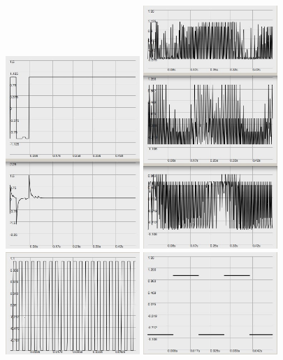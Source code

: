 \documentclass[letterpaper, 12pt]{article}
\begin{document}
\begin{figure}
	\centering
		\includegraphics[width=2in]{wv-POPdestroy-noRandom}
		\includegraphics[width=2in]{wv-POPdestroy-random}
		\includegraphics[width=2in]{wv-impulse}
		\includegraphics[width=2in]{wv-pulse202}

\end{figure}
\end{document}

